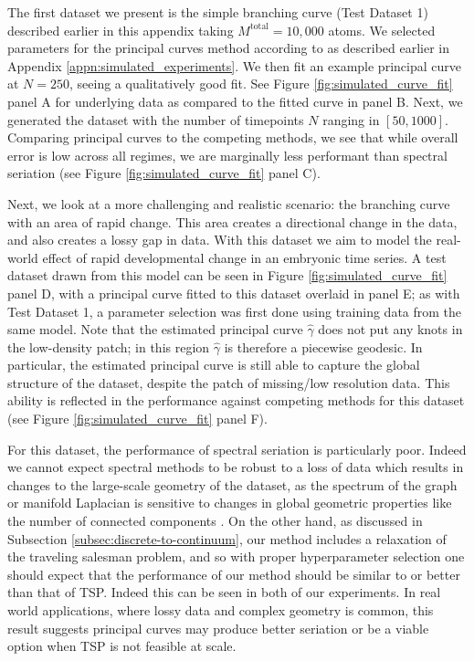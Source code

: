 \documentclass[aos, preprint]{imsart}
\theoremstyle{plain}
\theoremstyle{remark}
\begin{document}
\begin{appendix}
The first dataset we present is the simple branching curve (Test Dataset 1) described earlier in this appendix taking $M^{\text{total}} = 10{,}000$ atoms. We selected parameters for the principal curves method according to as described earlier in Appendix \ref{appn:simulated_experiments}. We then fit an example principal curve at $N = 250$, seeing a qualitatively good fit. See Figure \ref{fig:simulated_curve_fit} panel A for underlying data as compared to the fitted curve in panel B. Next, we generated the dataset with the number of timepoints $N$ ranging in $[50, 1000]$. Comparing principal curves to the competing methods, we see that while overall error is low across all regimes, we are marginally less performant than spectral seriation (see Figure \ref{fig:simulated_curve_fit} panel C).



Next, we look at a more challenging and realistic scenario: the branching curve with an area of rapid change. This area creates a directional change in the data, and also creates a lossy gap in data. With this dataset we aim to model the real-world effect of rapid developmental change in an embryonic time series. A test dataset drawn from this model can be seen in Figure \ref{fig:simulated_curve_fit} panel D, with a principal curve fitted to this dataset overlaid in panel E; as with Test Dataset 1, a parameter selection was first done using training data from the same model. Note that the estimated principal curve $\hat\gamma$ does not put any knots in the low-density patch; in this region $\hat\gamma$ is therefore a piecewise geodesic. In particular, the estimated principal curve is still able to capture the global structure of the dataset, despite the patch of missing/low resolution data. This ability is reflected in the performance against competing methods for this dataset (see Figure \ref{fig:simulated_curve_fit} panel F).

For this dataset, the performance of spectral seriation is particularly poor. Indeed we cannot expect spectral methods to be robust to a loss of data which results in changes to the large-scale geometry of the dataset, as the spectrum of the graph or manifold Laplacian is sensitive to changes in global geometric properties like the number of connected components \cite{chung1997spectral, ng2001spectral, schiebinger2015geometry}. On the other hand, as discussed in Subsection \ref{subsec:discrete-to-continuum}, our method includes a relaxation of the traveling salesman problem, and so with proper hyperparameter selection one should expect that the performance of our method should be similar to or better than that of TSP. Indeed this can be seen in both of our experiments. In real world applications, where lossy data and complex geometry is common, this result suggests principal curves may produce better seriation or be a viable option when TSP is not feasible at scale.


\end{appendix}
\end{document}
